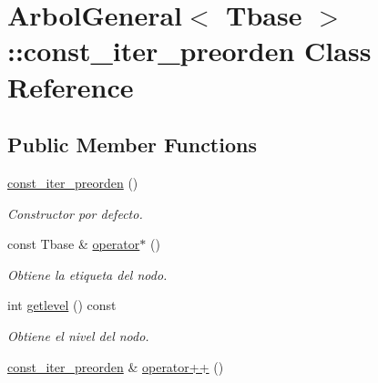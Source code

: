 \hypertarget{classArbolGeneral_1_1const__iter__preorden}{\section{Arbol\-General$<$ Tbase $>$\-:\-:const\-\_\-iter\-\_\-preorden Class Reference}
\label{classArbolGeneral_1_1const__iter__preorden}
}
\subsection*{Public Member Functions}
\begin{DoxyCompactItemize}
\item 
\hypertarget{classArbolGeneral_1_1const__iter__preorden_ad884ef2edc3cbd1771f1c94125f4e5b5}{\hyperlink{classArbolGeneral_1_1const__iter__preorden_ad884ef2edc3cbd1771f1c94125f4e5b5}{const\-\_\-iter\-\_\-preorden} ()}\label{classArbolGeneral_1_1const__iter__preorden_ad884ef2edc3cbd1771f1c94125f4e5b5}

\begin{DoxyCompactList}\small\item\em Constructor por defecto. \end{DoxyCompactList}\item 
\hypertarget{classArbolGeneral_1_1const__iter__preorden_a53e8802f25af646d966eabbcc32a1e51}{const Tbase \& \hyperlink{classArbolGeneral_1_1const__iter__preorden_a53e8802f25af646d966eabbcc32a1e51}{operator$\ast$} ()}\label{classArbolGeneral_1_1const__iter__preorden_a53e8802f25af646d966eabbcc32a1e51}

\begin{DoxyCompactList}\small\item\em Obtiene la etiqueta del nodo. \end{DoxyCompactList}\item 
\hypertarget{classArbolGeneral_1_1const__iter__preorden_a354a95ddbe9d7c534fdb7930f6d5f580}{int \hyperlink{classArbolGeneral_1_1const__iter__preorden_a354a95ddbe9d7c534fdb7930f6d5f580}{getlevel} () const }\label{classArbolGeneral_1_1const__iter__preorden_a354a95ddbe9d7c534fdb7930f6d5f580}

\begin{DoxyCompactList}\small\item\em Obtiene el nivel del nodo. \end{DoxyCompactList}\item 
\hypertarget{classArbolGeneral_1_1const__iter__preorden_a2210e98aa998197a96ac5b4d45ed64d3}{\hyperlink{classArbolGeneral_1_1const__iter__preorden}{const\-\_\-iter\-\_\-preorden} \& \hyperlink{classArbolGeneral_1_1const__iter__preorden_a2210e98aa998197a96ac5b4d45ed64d3}{operator++} ()}\label{classArbolGeneral_1_1const__iter__preorden_a2210e98aa998197a96ac5b4d45ed64d3}


\end{DoxyCompactItemize}
